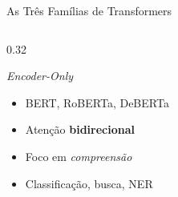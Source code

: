 \documentclass[aspectratio=169, xcolor=dvipsnames]{beamer}
\begin{document}
\begin{frame}{As Três Famílias de Transformers}
\begin{columns}[T]
      \begin{column}{0.32\textwidth}
        \begin{block}{\textit{Encoder-Only}}
          \begin{itemize}
            \item BERT, RoBERTa, DeBERTa
            \item Atenção \textbf{bidirecional}
            \item Foco em \textit{compreensão}
            \item Classificação, busca, NER
          \end{itemize}
        \end{block}
      \end{column}
    \end{columns}
  \end{frame}
\end{document}
